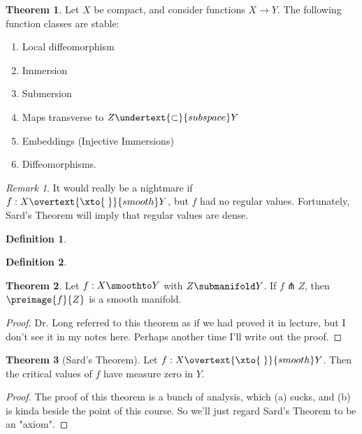 \documentclass[a5paper]{article}
\theoremstyle{definition}%
\newtheorem{theorem}{Theorem}
\newtheorem*{definition*}{Definition}
\numberwithin{exercise}{section}
\theoremstyle{remark}%
\newtheorem*{remark*}{Remark}
\begin{document}
\pagebreak
\begin{highlight}
\begin{theorem}
Let $X$ be compact, and consider functions $X\to Y$. The following function classes are stable: 
	\begin{enumerate}[label=(\alph*)]
	\item Local diffeomorphism
	\item Immersion
	\item Submersion
	\item Maps transverse to $Z\undertext{\subset}{subspace}Y$
	\item \vspace*{-5pt} Embeddings (Injective Immersions)
	\item Diffeomorphisms.
	\end{enumerate}
\end{theorem}
\end{highlight}

\begin{remark*}
It would really be a nightmare if $f:X\overtext{\xto{\;}}{smooth} Y$, but $f$ had no regular values. Fortunately, Sard's Theorem will imply that regular values are dense. 
\end{remark*}

\begin{definition*}\mbox{}
\end{definition*}

\begin{definition*}\mbox{}
\end{definition*}

\begin{highlight}
\begin{theorem}
\vspace*{-12pt} Let $f:X \smoothto Y$ with $Z\submanifold Y$. If $f\pitchfork Z$, then $\preimage{f}{Z}$ is a smooth manifold.
\end{theorem}
\end{highlight}
\begin{proof}
Dr. Long referred to this theorem as if we had proved it in lecture, but I don't see it in my notes here. Perhaps another time I'll write out the proof. 
\end{proof}

\begin{highlight}
\begin{theorem}[Sard's Theorem]
\vspace*{-12pt} Let $f:X\overtext{\xto{\;}}{smooth} Y$. Then the critical values of $f$ have measure zero in $Y$. 
\end{theorem}
\end{highlight}
\begin{proof}
The proof of this theorem is a bunch of analysis, which (a) sucks, and (b) is kinda beside the point of this course. So we'll just regard Sard's Theorem to be an "axiom".
\end{proof}
\end{document}
